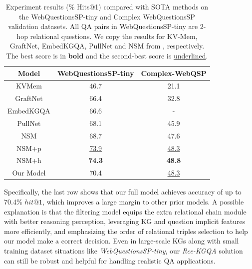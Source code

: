 \documentclass[pdflatex,sn-mathphys]{sn-jnl}%
\theoremstyle{thmstyleone}%
\theoremstyle{thmstyletwo}%
\theoremstyle{thmstylethree}%
\begin{document}
\begin{table}[h]
    \centering
    \begin{tabular}{c|c|c} \hline
    Model & WebQuestionsSP-tiny & Complex-WebQSP\\ \hline %
    KVMem & 46.7 & 21.1 \\ \hline
    GraftNet & 66.4 & 32.8 \\ \hline
    EmbedKGQA & 66.6 & - \\ \hline
    PullNet & 68.1 & 45.9 \\ \hline
    NSM & 68.7 & 47.6 \\ \hline
    NSM+p & \underline{73.9} & \underline{48.3} \\ \hline
    NSM+h & \bf{74.3} & \bf{48.8} \\ \hline
    Our Model & 70.4 & \underline{48.3} \\ \hline
    \end{tabular}
    \caption{Experiment results (\% Hits@1) compared with SOTA methods on the WebQuestionsSP-tiny and Complex WebQuestionsSP validation datasets. All QA pairs in WebQuestionsSP-tiny are 2-hop relational questions. We copy the results for KV-Mem, GraftNet, EmbedKGQA, PullNet and NSM from \cite{kvmem,sun2018graftnet,apoorv2020embedKGQA,pullnet,he2021stu-teaQA}, respectively. The best score is in \textbf{bold} and the second-best score is \underline{underlined}.}
    \label{comparison_sota_wbq}
\end{table}


Specifically, the last row shows that our full model achieves accuracy of up to 70.4\% $hit@1$, which improves a large margin to other prior models. A possible explanation is that the filtering model equips the extra relational chain module with better reasoning perception, leveraging KG and question implicit features more efficiently, and emphasizing the order of relational triples selection to help our model make a correct decision. Even in large-scale KGs along with small training dataset situations like \textit{WebQuestionsSP-tiny}, our \textit{Rce-KGQA} solution can still be robust and helpful for handling realistic QA applications.
\end{document}
